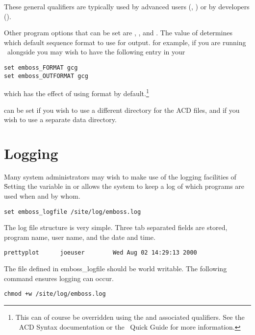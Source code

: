 \documentclass{report}
\begin{document}
These general qualifiers are typically used by advanced users
(, ) or by developers
().


Other program options that can be set are ,
, and . The value of
 determines which default sequence format to
use for output. for example, if you are running \EMBOSS\ alongside
 you may wish to have the following entry in your

\begin{verbatim}
set emboss_FORMAT gcg
set emboss_OUTFORMAT gcg
\end{verbatim}

which has the effect of using  format by
default.\footnote{This can of course be overridden using the
 and  associated qualifiers. See
the \EMBOSS\ ACD Syntax documentation or the \EMBOSS\ Quick Guide for
more information.}

  can be set if you
wish to use a different directory for the ACD files, and
  if you wish to use a
separate data directory.


\section{Logging}

Many system administrators may wish to make use of the logging
facilities of \EMBOSS\. Setting the variable 
in  or  allows the system
to keep a log of which programs are used when and by whom.

\begin{verbatim}
set emboss_logfile /site/log/emboss.log
\end{verbatim}

The log file structure is very simple. Three tab separated fields are
stored, program name, user name, and the date and time.

\begin{verbatim}
prettyplot      joeuser        Wed Aug 02 14:29:13 2000
\end{verbatim}

The file defined in emboss\_logfile should be world writable. The
following command ensures logging can occur.

\begin{verbatim}
chmod +w /site/log/emboss.log
\end{verbatim}
\end{document}
